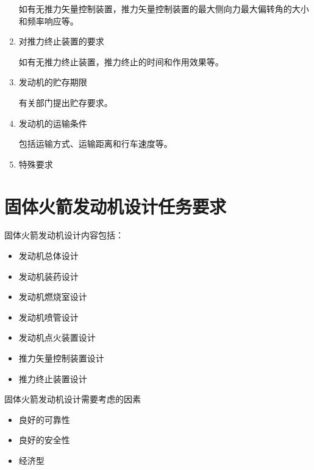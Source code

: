 \begin{enumerate}[leftmargin=2em]
  如有无推力矢量控制装置，推力矢量控制装置的最大侧向力最大偏转角的大小和频率响应等。

  \item 对推力终止装置的要求
  
  如有无推力终止装置，推力终止的时间和作用效果等。

  \item 发动机的贮存期限
  
  有关部门提出贮存要求。

  \item 发动机的运输条件
  
  包括运输方式、运输距离和行车速度等。

  \item 特殊要求
  

  
\end{enumerate}
\section{固体火箭发动机设计任务要求}

固体火箭发动机设计内容包括：

\begin{itemize}[leftmargin=2em]
  \item 发动机总体设计
  \item 发动机装药设计
  \item 发动机燃烧室设计
  \item 发动机喷管设计
  \item 发动机点火装置设计
  \item 推力矢量控制装置设计
  \item 推力终止装置设计
\end{itemize}

固体火箭发动机设计需要考虑的因素

\begin{itemize}[leftmargin=2em]
  \item 良好的可靠性
  \item 良好的安全性
  \item 经济型
\end{itemize}
